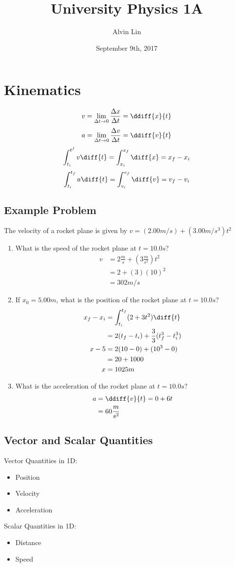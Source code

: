 \documentclass[letterpaper, 12pt]{math}
\title{University Physics 1A}
\author{Alvin Lin}
\date{September 9th, 2017}
\begin{document}
\maketitle

\section*{Kinematics}
\[ v = \lim_{\Delta t\to0}\frac{\Delta x}{\Delta t} = \ddiff{x}{t} \]
\[ a = \lim_{\Delta t\to0}\frac{\Delta v}{\Delta t} = \ddiff{v}{t} \]
\[ \int_{t_i}^{t^f}v\diff{t} = \int_{x_i}^{x_f}\diff{x} = x_f-x_i \]
\[ \int_{t_i}^{t_f}a\diff{t} = \int_{v_i}^{v_f}\diff{v} = v_f-v_i \]

\subsection*{Example Problem}
The velocity of a rocket plane is given by \( v = (2.00 m/s) + (3.00m/s^3)t^2 \)
\begin{enumerate}
  \item What is the speed of the rocket plane at \( t = 10.0s \)?
    \begin{align*}
      v &= 2\frac{m}{s}+(3\frac{m}{s^2})t^2 \\
      &= 2+(3)(10)^2 \\
      &= 302m/s
    \end{align*}
  \item If \( x_0 = 5.00m \), what is the position of the rocket plane at
    \( t = 10.0s \)?
    \begin{align*}
      x_f-x_i &= \int_{t_i}^{t_f}(2+3t^2)\diff{t} \\
      &= 2(t_f-t_i)+\frac{3}{3}(t_f^3-t_i^3) \\
      x-5 &= 2(10-0)+(10^3-0) \\
      &= 20+1000 \\
      x &= 1025m
    \end{align*}
  \item What is the acceleration of the rocket plane at \( t = 10.0s \)?
    \begin{align*}
      a &= \ddiff{v}{t} = 0+6t \\
      &= 60\frac{m}{s^2}
    \end{align*}
\end{enumerate}

\subsection*{Vector and Scalar Quantities}
Vector Quantities in 1D:
\begin{itemize}
  \item Position
  \item Velocity
  \item Acceleration
\end{itemize}
Scalar Quantities in 1D:
\begin{itemize}
  \item Distance
  \item Speed
\end{itemize}
\end{document}
